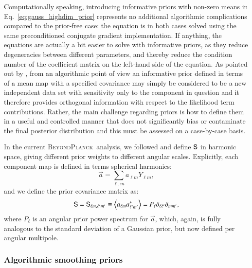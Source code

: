 \documentclass{aa}
\renewcommand{\a}[0]{\vec{a}}
\renewcommand{\S}[0]{\tens{S}}
\newcommand{\BP}{\textsc{BeyondPlanck}}
\begin{document}
Computationally speaking, introducing informative priors with non-zero
means in Eq.~\eqref{eq:gauss_highdim_prior} represents no additional
algorithmic complications compared to the prior-free case: the
equation is in both cases solved using the same preconditioned
conjugate gradient implementation. If anything, the equations are
actually a bit easier to solve with informative priors, as they reduce
degeneracies between different parameters, and thereby reduce the
condition number of the coefficient matrix on the left-hand side of
the equation. As pointed out by \citet{seljebotn:2019}, from an
algorithmic point of view an informative prior defined in terms
  of a mean map with a specified covariance may simply be considered
to be a new independent data set with sensitivity only to the
component in question and it therefore provides orthogonal
information with respect to the likelihood term contributions. Rather,
the main challenge regarding priors is how to define them in a useful
and controlled manner that does not significantly bias or contaminate
the final posterior distribution and this must be assessed on a
case-by-case basis.

In the current \BP\ analysis, we followed \citet{planck2016-l04} and
define $\S$ in harmonic space, giving different prior weights to
different angular scales. Explicitly, each component map is defined in
terms spherical harmonics:
\begin{equation}
  \a = \sum_{\ell,m} a_{\ell m} Y_{\ell m},
\end{equation}
and we define the prior covariance matrix as:
\begin{equation}
  \S = \S_{\ell m,\ell'm'} \equiv \left<a_{\ell m}a^*_{\ell' m'}\right> = P_{\ell}\delta_{\ell\ell'}\delta_{mm'},
\end{equation}
where $P_{\ell}$ is an angular prior power spectrum for $\a$, which,
again, is fully analogous to the standard deviation of a Gaussian
prior, but now defined per angular multipole.

\subsubsection{Algorithmic smoothing priors}
\end{document}
